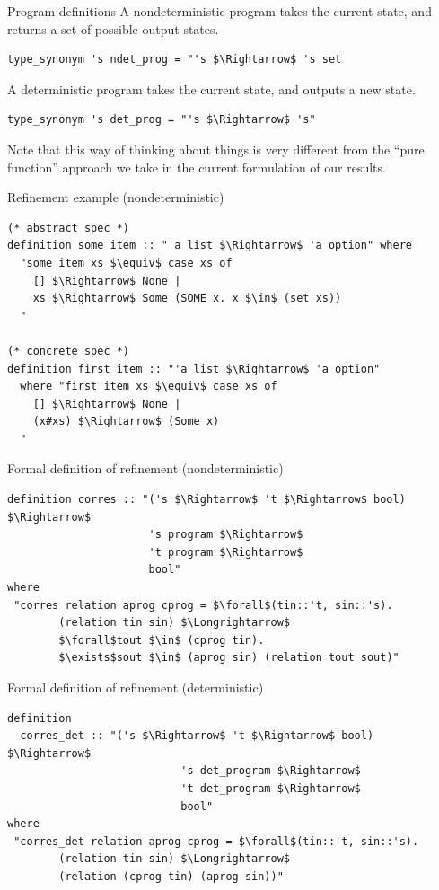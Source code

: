 \documentclass{beamer}
\begin{document}
\begin{frame}[fragile]{Program definitions}
A nondeterministic program takes the current state,
and returns a set of possible output states.
\begin{lstlisting}[language=isabelle]
type_synonym 's ndet_prog = "'s $\Rightarrow$ 's set
\end{lstlisting}

A deterministic program takes the current state,
and outputs a new state.
\begin{lstlisting}[language=isabelle]
type_synonym 's det_prog = "'s $\Rightarrow$ 's"
\end{lstlisting}
Note that this way of thinking about things is
very different from the ``pure function'' approach
we take in the current formulation of our results.
\end{frame}


\begin{frame}[fragile]{Refinement example (nondeterministic)}
\begin{lstlisting}[language=isabelle]
(* abstract spec *)
definition some_item :: "'a list $\Rightarrow$ 'a option" where
  "some_item xs $\equiv$ case xs of 
    [] $\Rightarrow$ None |
    xs $\Rightarrow$ Some (SOME x. x $\in$ (set xs))
  "

(* concrete spec *)
definition first_item :: "'a list $\Rightarrow$ 'a option"
  where "first_item xs $\equiv$ case xs of 
    [] $\Rightarrow$ None |
    (x#xs) $\Rightarrow$ (Some x)
  "
\end{lstlisting} 
\end{frame}

\begin{frame}[fragile]{Formal definition of refinement (nondeterministic)}
\begin{lstlisting}
definition corres :: "('s $\Rightarrow$ 't $\Rightarrow$ bool) $\Rightarrow$
                      's program $\Rightarrow$
                      't program $\Rightarrow$
                      bool"
where
 "corres relation aprog cprog = $\forall$(tin::'t, sin::'s).
        (relation tin sin) $\Longrightarrow$
        $\forall$tout $\in$ (cprog tin).
        $\exists$sout $\in$ (aprog sin) (relation tout sout)"

\end{lstlisting}
\end{frame}

\begin{frame}[fragile]{Formal definition of refinement (deterministic)}
\begin{lstlisting}
definition
  corres_det :: "('s $\Rightarrow$ 't $\Rightarrow$ bool) $\Rightarrow$
                           's det_program $\Rightarrow$
                           't det_program $\Rightarrow$
                           bool"
where
 "corres_det relation aprog cprog = $\forall$(tin::'t, sin::'s).
        (relation tin sin) $\Longrightarrow$
        (relation (cprog tin) (aprog sin))"

\end{lstlisting}
\end{frame}
\end{document}
